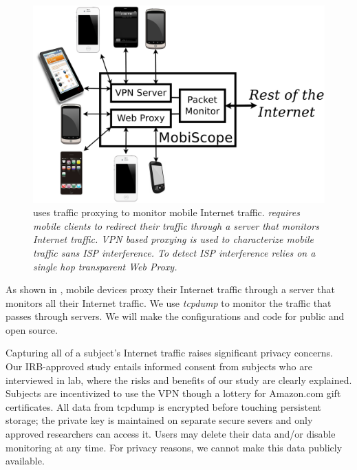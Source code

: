 \begin{figure}
\includegraphics[width=\columnwidth]{figures/meddle-servers.pdf}
\caption{\platname uses traffic proxying to monitor mobile Internet traffic. \platname \emph{requires mobile clients to redirect their traffic through a server that monitors Internet traffic. VPN based proxying is used to characterize mobile traffic sans ISP interference. To detect ISP interference \platname relies on a single hop transparent Web Proxy.}}
\label{fig:description}
\end{figure}

As shown in , mobile devices proxy their Internet traffic through a \platname server that monitors all their Internet traffic. 
%
We use \emph{tcpdump} to monitor the traffic that passes through \platname servers. We will make the 
configurations and code for \platname public and open source.

Capturing all of a subject's Internet traffic raises significant privacy concerns. Our IRB-approved study 
entails informed consent from subjects who are interviewed in lab, where the risks and benefits of 
our study are clearly explained. Subjects are incentivized to use the VPN though a lottery for Amazon.com 
gift certificates. All data from tcpdump is encrypted before touching persistent storage; the private key 
is maintained on separate secure severs and only approved researchers can access it. Users may 
delete their data and/or disable monitoring at any time. For privacy reasons, we cannot make this 
data publicly available. 



